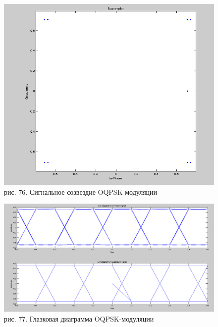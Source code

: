 \documentclass[10pt,a4paper]{report}
\begin{document}
\begin{figure}
\begin{center}
\includegraphics[width=150mm, scale = 0.9]{9_9}\newline
рис. 76. Сигнальное созвездие OQPSK-модуляции\newline
\end{center}
\end{figure}
\begin{figure}
\begin{center}
\includegraphics[width=150mm, scale = 0.9]{9_10}\newline
рис. 77. Глазковая диаграмма OQPSK-модуляции\newline
\end{center}
\end{figure}
\end{document}

